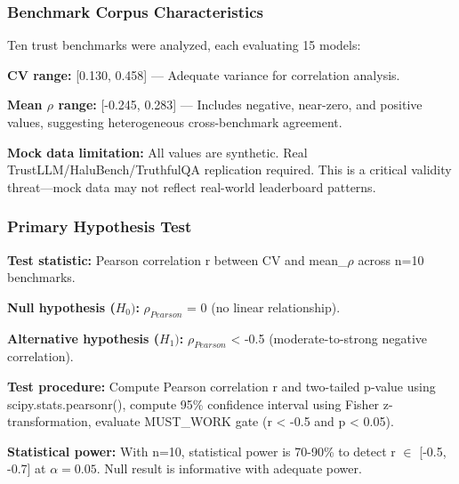
\subsubsection{Benchmark Corpus Characteristics}

Ten trust benchmarks were analyzed, each evaluating 15 models:

\begin{table}[htbp]
\centering
{}
\end{table}

\textbf{CV range:} [0.130, 0.458] --- Adequate variance for correlation analysis.

\textbf{Mean $\rho$ range:} [-0.245, 0.283] --- Includes negative, near-zero, and positive values, suggesting heterogeneous cross-benchmark agreement.

\textbf{Mock data limitation:} All values are synthetic. Real TrustLLM/HaluBench/TruthfulQA replication required. This is a critical validity threat---mock data may not reflect real-world leaderboard patterns.

\subsubsection{Primary Hypothesis Test}

\textbf{Test statistic:} Pearson correlation r between CV and mean\_$\rho$ across n=10 benchmarks.

\textbf{Null hypothesis ($H_{0})$:} $\rho_{Pearson}$ = 0 (no linear relationship).

\textbf{Alternative hypothesis ($H_{1})$:} $\rho_{Pearson}$ < -0.5 (moderate-to-strong negative correlation).

\textbf{Test procedure:} Compute Pearson correlation r and two-tailed p-value using scipy.stats.pearsonr(), compute 95\% confidence interval using Fisher z-transformation, evaluate MUST\_WORK gate (r < -0.5 and p < 0.05).

\textbf{Statistical power:} With n=10, statistical power is 70-90\% to detect r $\in$ [-0.5, -0.7] at $\alpha =0.05$. Null result is informative with adequate power.
